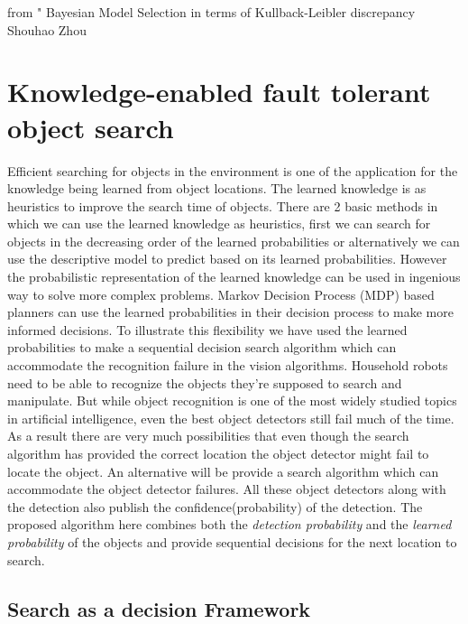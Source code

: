 \documentclass[11pt]{report}
\begin{document}
from " Bayesian Model Selection in terms of Kullback-Leibler discrepancy
Shouhao Zhou

%


\chapter{Knowledge-enabled fault tolerant object search}
\label{cha}

Efficient searching for objects in the environment is one of the application for the knowledge being learned from object locations. The learned knowledge is as heuristics to improve the search time of objects. There are 2 basic methods in which we can use the learned knowledge as heuristics, first we can search for objects in the decreasing order of the learned probabilities or alternatively we can use the descriptive model to predict based on its learned probabilities. However the probabilistic representation of the learned knowledge can be used in ingenious way to solve more complex problems. Markov Decision Process (MDP) based planners can use the learned probabilities in their decision process to make more informed decisions. To illustrate this flexibility we have used the learned probabilities to make a sequential decision search algorithm which can accommodate the recognition failure in the vision algorithms.
Household robots need to be able to recognize the objects they’re supposed to search and manipulate. But while object recognition is one of the most widely studied topics in artificial intelligence, even the best object detectors still fail much of the time. As a result there are very much possibilities that even though the search algorithm has provided the correct location the object detector might fail to locate the object. An alternative will be provide a search algorithm which can accommodate the object detector failures. All these object detectors along with the detection also publish the confidence(probability) of the detection. The proposed algorithm here combines both the \emph{detection probability} and the \emph{learned probability} of the objects and provide sequential decisions for the next location to search.

\section{Search as a decision Framework}
\end{document}
